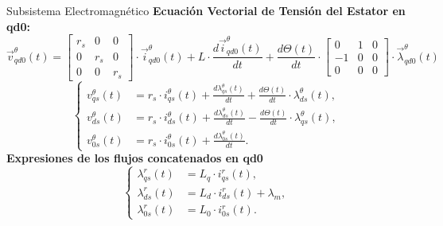 \documentclass[12pt]{beamer}
\begin{document}
\begin{frame}{Subsistema Electromagnético}
    \footnotesize
    \textbf{Ecuación Vectorial de Tensión del Estator en qd0:}
    \[
    \vec{v}^\theta_{qd0}(t) =
    \begin{bmatrix}
        r_s & 0 & 0 \\
        0 & r_s & 0 \\
        0 & 0 & r_s
    \end{bmatrix}
    \cdot \vec{i}^\theta_{qd0}(t) + 
    L \cdot \frac{d\vec{i}^\theta_{qd0}(t)}{dt} +
    \frac{d\Theta(t)}{dt} \cdot
    \begin{bmatrix}
        0 & 1 & 0 \\
        -1 & 0 & 0 \\
        0 & 0 & 0
    \end{bmatrix}
    \cdot \vec{\lambda}^\theta_{qd0}(t)
    \]
    \begin{equation}
    \left\{
    \begin{aligned}
    v^\theta_{qs}(t) &= r_s \cdot i^\theta_{qs}(t) + \frac{d\lambda^\theta_{qs}(t)}{dt} + \frac{d\Theta(t)}{dt} \cdot \lambda^\theta_{ds}(t), \\
    v^\theta_{ds}(t) &= r_s \cdot i^\theta_{ds}(t) + \frac{d\lambda^\theta_{ds}(t)}{dt} - \frac{d\Theta(t)}{dt} \cdot \lambda^\theta_{qs}(t), \\
    v^\theta_{0s}(t) &= r_s \cdot i^\theta_{0s}(t) + \frac{d\lambda^\theta_{0s}(t)}{dt}.
    \end{aligned}
    \right.
    \end{equation}
    \textbf{Expresiones de los flujos concatenados en qd0}
    \[
    \left\{
    \begin{aligned}
        \lambda^{r}_{qs}(t) &= L_q \cdot i^{r}_{qs}(t), \\
        \lambda^{r}_{ds}(t) &= L_d \cdot i^{r}_{ds}(t) + \lambda_m, \\
        \lambda^{r}_{0s}(t) &= L_0 \cdot i^{r}_{0s}(t).
    \end{aligned}
    \right.
    \]
\end{frame}
\end{document}
